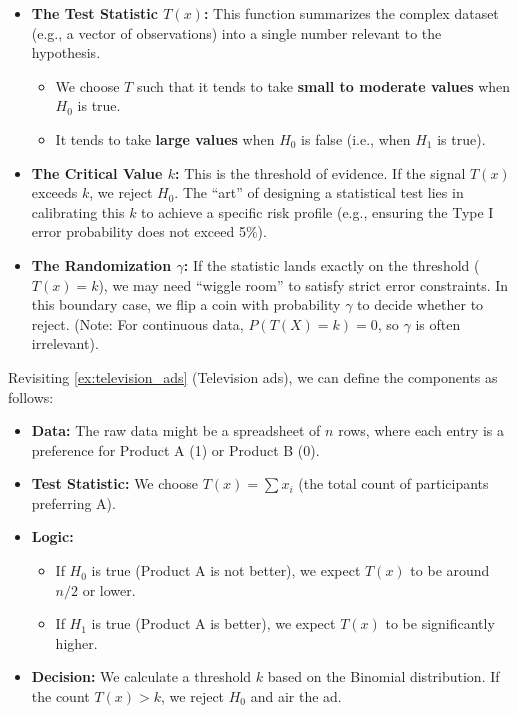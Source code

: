 \begin{itemize}
    \item \textbf{The Test Statistic \(T(x)\):} This function summarizes the complex dataset (e.g., a vector of observations) into a single number relevant to the hypothesis. 
    \begin{itemize}
        \item We choose \(T\) such that it tends to take \textbf{small to moderate values} when \(H_0\) is true.
        \item It tends to take \textbf{large values} when \(H_0\) is false (i.e., when \(H_1\) is true).
    \end{itemize}
    
    \item \textbf{The Critical Value \(k\):} This is the threshold of evidence. If the signal \(T(x)\) exceeds \(k\), we reject \(H_0\). The ``art'' of designing a statistical test lies in calibrating this \(k\) to achieve a specific risk profile (e.g., ensuring the Type I error probability does not exceed 5\%).

    \item \textbf{The Randomization \(\gamma\):} If the statistic lands exactly on the threshold (\(T(x) = k\)), we may need ``wiggle room'' to satisfy strict error constraints. In this boundary case, we flip a coin with probability \(\gamma\) to decide whether to reject. (Note: For continuous data, \(P(T(X)=k) = 0\), so \(\gamma\) is often irrelevant).
\end{itemize}

\begin{ex}
Revisiting \autoref{ex:television_ads} (Television ads), we can define the components as follows:

\begin{itemize}
    \item \textbf{Data:} The raw data might be a spreadsheet of $n$ rows, where each entry is a preference for Product A (1) or Product B (0).
    \item \textbf{Test Statistic:} We choose \(T(x) = \sum x_i\) (the total count of participants preferring A).
    \item \textbf{Logic:}
    \begin{itemize}
        \item If \(H_0\) is true (Product A is not better), we expect \(T(x)\) to be around \(n/2\) or lower.
        \item If \(H_1\) is true (Product A is better), we expect \(T(x)\) to be significantly higher.
    \end{itemize}
    \item \textbf{Decision:} We calculate a threshold \(k\) based on the Binomial distribution. If the count \(T(x) > k\), we reject \(H_0\) and air the ad.
\end{itemize}
\end{ex}

